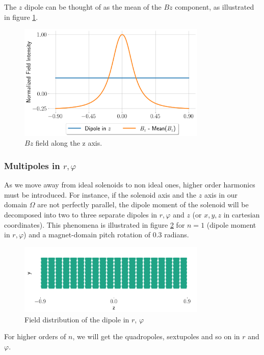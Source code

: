 The $z$ dipole can be thought of as the mean of the $Bz$
component, as illustrated in figure \ref{fig:solfundipplot}.

\begin{figure}[!h]
    \centering
    \includegraphics[width=0.8\textwidth]{figs/solfundipplot.png}
    \caption{$Bz$ field along the z axis.}
    \label{fig:solfundipplot}
\end{figure}

\subsubsection{Multipoles in $r, \varphi$}
As we move away from ideal solenoids to non ideal ones,
higher order harmonics must be introduced. For instance,
if the solenoid axis and the $z$ axis in our domain $\Omega$
are not perfectly parallel, the dipole moment of the solenoid 
will be decomposed into two to three separate dipoles in
$r, \varphi$ and $z$ (or $x,y,z$ in cartesian coordinates).
This phenomena is illustrated in figure \ref{fig:rphidip}
for $n=1$ (dipole moment in $r, \varphi$) and a
magnet-domain pitch rotation of 0.3 radians.

\begin{figure}[!h]
    \centering
    \includegraphics[width=0.8\textwidth]{figs/rphidip.png}
    \caption{Field distribution of the dipole in $r$, $\varphi$}
    \label{fig:rphidip}
\end{figure}

For higher orders of $n$, we will get the quadropoles, sextupoles
and so on in $r$ and $\varphi$.

